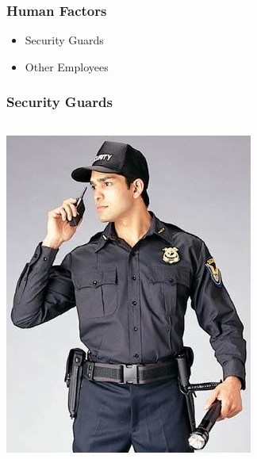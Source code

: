 \documentclass[]{beamer}
\begin{document}
\begin{frame}
  \frametitle{Human Factors}
\begin{itemize}
  \item Security Guards
  \item Other Employees

\end{itemize}
\end{frame}

\begin{frame}
  \frametitle{Security Guards}
  \begin{columns}[c]
    \includegraphics[width=.8\textwidth]{Security-Guard}

  \end{columns}

\end{frame}
\end{document}
